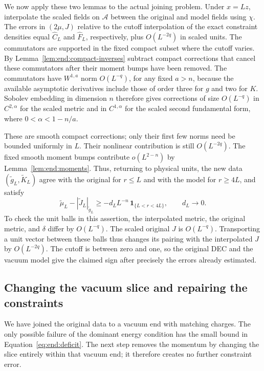 We now apply these two lemmas to the actual joining problem.
Under $x=Lz$, interpolate the scaled fields on $\mathcal A$
between the original and model fields using $\chi$. The errors in
$(2\mu,J)$ relative to the cutoff interpolation of the exact
constraint densities equal $\widehat C_L$ and $\widehat F_L$,
respectively, plus $O(L^{-2q})$ in scaled units. The commutators are
supported in the fixed compact subset where the cutoff varies. By
Lemma~\ref{lem:end:compact-inverses} subtract compact corrections
that cancel these commutators after their moment bumps have
been removed.  The commutators have $W^{1,a}$ norm $O(L^{-q})$,
for any fixed $a>n$, because the available asymptotic derivatives
include those of order three for $g$ and two for $K$.
Sobolev embedding in dimension $n$ therefore gives corrections
of size $O(L^{-q})$ in $C^{2,\alpha}$ for the scaled metric
and in $C^{1,\alpha}$ for the scaled second fundamental form,
where $0<\alpha<1-n/a$.

These are smooth compact corrections; only their first few norms
need be bounded uniformly in $L$.  Their nonlinear contribution
is still $O(L^{-2q})$.  The fixed smooth moment bumps contribute
$o(L^{2-n})$ by Lemma~\ref{lem:end:moments}.  Thus, returning to
physical units, the new data $(\widetilde g_L,\widetilde K_L)$
agree with the original for $r\le L$ and with the model for
$r\ge4L$, and satisfy
\begin{equation}\label{eq:end:deficit}
 \widetilde\mu_L-|\widetilde J_L|_{\widetilde g_L}
 \ge-d_L L^{-n}\,\mathbf 1_{\{L<r<4L\}},\qquad d_L\longrightarrow0.
\end{equation}
To check the unit balls in this assertion, the interpolated
metric, the original metric, and $\delta$ differ by $O(L^{-q})$.
The scaled original $J$ is $O(L^{-q})$.  Transporting a unit
vector between these balls thus changes its pairing with the
interpolated $J$ by $O(L^{-2q})$.  The cutoff is between zero
and one, so the original DEC and the vacuum model give the
claimed sign after precisely the errors already estimated.

\subsection{Changing the vacuum slice and repairing the constraints}

We have joined the original data to a vacuum end with matching
charges.  The only possible failure of the dominant energy condition
has the small bound in Equation~\eqref{eq:end:deficit}.  The next step
removes the momentum by changing the slice entirely within that
vacuum end; it therefore creates no further constraint error.

